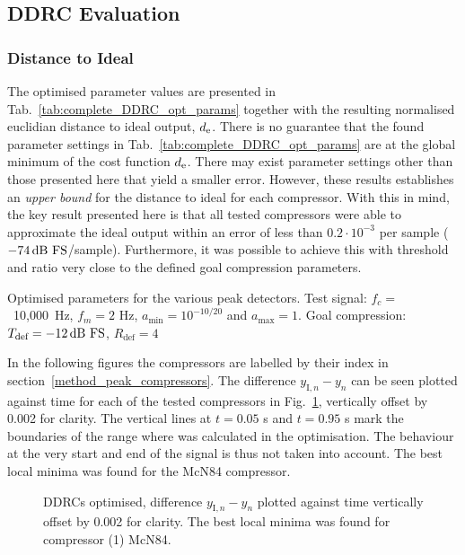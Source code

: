 \documentclass[../main2.tex]{subfiles}
\providecommand{\rootdir}{..}
\begin{document}
\subsection{DDRC Evaluation}

\subsubsection{Distance to Ideal}
The optimised parameter values are presented in Tab.~\ref{tab:complete_DDRC_opt_params} together with the resulting normalised euclidian distance to ideal output, $d_\text{e}$. There is no guarantee that the found parameter settings in Tab.~\ref{tab:complete_DDRC_opt_params} are at the global minimum of the cost function $d_\text{e}$. There may exist parameter settings other than those presented here that yield a smaller error. However, these results establishes an \emph{upper bound} for the distance to ideal for each compressor. With this in mind, the key result presented here is that all tested compressors were able to approximate the ideal output within an error of less than $0.2\cdot 10^{-3}$ per sample ($-74 \mskip3mu\text{dB~FS}$/sample). Furthermore, it was possible to achieve this with threshold and ratio very close to the defined goal compression parameters.

\begin{table}[h]
\small
\begin{center}
\caption{Optimised parameters for the various peak detectors. Test signal: $f_c=$~10,000~Hz, $f_m=2$ Hz, $a_\text{min} = 10^{-10/20}$ and $a_\text{max} = 1$. Goal compression: $T_\text{def}=-12 \mskip3mu\text{dB~FS}$, $R_\text{def}=4$}
\label{tab:complete_DDRC_opt_params}

\end{center}
\end{table}

In the following figures the compressors are labelled by their index in section~\ref{method_peak_compressors}. The difference $y_{\text{I},n} - y_n$ can be seen plotted against time for each of the tested compressors in Fig.~\ref{fig:complete_DDRC_opt_diff}, vertically offset by 0.002 for clarity. The vertical lines at $t=0.05$ s and $t=0.95$ s mark the boundaries of the range where \EN was calculated in the optimisation. The behaviour at the very start and end of the signal is thus not taken into account. The best local minima was found for the McN84 compressor.

\begin{figure}[h]
\centerline{}
\caption{DDRCs optimised, difference $y_{\text{I},n} - y_n$ plotted against time vertically offset by 0.002 for clarity. The best local minima was found for compressor (1) McN84.}
\label{fig:complete_DDRC_opt_diff}
\end{figure}
\end{document}
